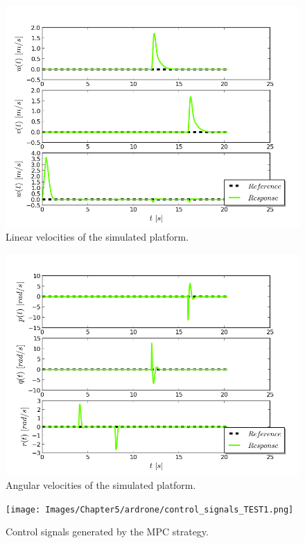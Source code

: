 \begin{figure}[H]
\centering
\includegraphics[scale=0.7]{Images/Chapter5/ardrone/lin_velocity_control.png}
\caption{Linear velocities of the simulated platform. }
\label{fig:ardrone_lin_vel}
\end{figure}

\begin{figure}[H]
\centering
\includegraphics[scale=0.7]{Images/Chapter5/ardrone/ang_velocity_control.png}
\caption{Angular velocities of the simulated platform.}
\label{fig:ardrone_ang_vel}
\end{figure}

\begin{figure}[H]
\centering
\texttt{[image: Images/Chapter5/ardrone/control\_signals\_TEST1.png]}
\caption{Control signals generated by the MPC strategy.}
\label{fig:ardrone_inputs}
\end{figure}

